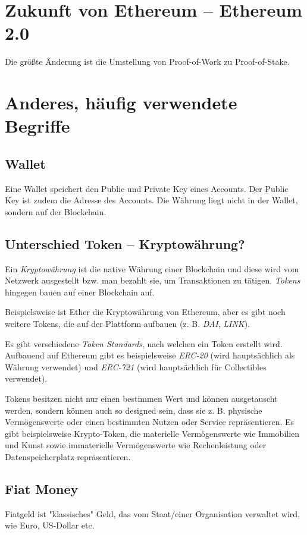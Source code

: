 \section{Zukunft von Ethereum -- Ethereum 2.0}
Die größte Änderung ist die Umstellung von Proof-of-Work zu Proof-of-Stake.

\section{Anderes, häufig verwendete Begriffe}

\subsection{Wallet}
Eine Wallet speichert den Public und Private Key eines Accounts. Der Public Key ist zudem die Adresse des Accounts. Die Währung liegt nicht in der Wallet, sondern auf der Blockchain.

\subsection{Unterschied Token -- Kryptowährung?}\label{l_tokens}
Ein \textit{Kryptowährung} ist die native Währung einer Blockchain und diese wird vom Netzwerk ausgestellt bzw. man bezahlt sie, um Transaktionen zu tätigen. \textit{Tokens} hingegen bauen auf einer Blockchain auf.

Beispielsweise ist Ether die Kryptowährung von Ethereum, aber es gibt noch weitere Tokens, die auf der Plattform aufbauen (z. B. \textit{DAI}, \textit{LINK}).

Es gibt verschiedene \textit{Token Standards}, nach welchen ein Token erstellt wird. Aufbauend auf Ethereum gibt es beispielsweise \textit{ERC-20} (wird hauptsächlich als Währung verwendet) und \textit{ERC-721} (wird hauptsächlich für Collectibles verwendet).

Tokens besitzen nicht nur einen bestimmen Wert und können ausgetauscht werden, sondern können auch so designed sein, dass sie z. B. physische Vermögenswerte oder einen bestimmten Nutzen oder Service repräsentieren. Es gibt beispielsweise Krypto-Token, die materielle Vermögenswerte wie Immobilien und Kunst sowie immaterielle Vermögenswerte wie Rechenleistung oder Datenspeicherplatz repräsentieren.

\cite[vgl. Gemini, Cryptocurrencies vs Tokens]{Cryptocurrencies_vs_Tokens}

\subsection{Fiat Money}
Fiatgeld ist "klassisches" Geld, das vom Staat/einer Organisation verwaltet wird, wie Euro, US-Dollar etc.

